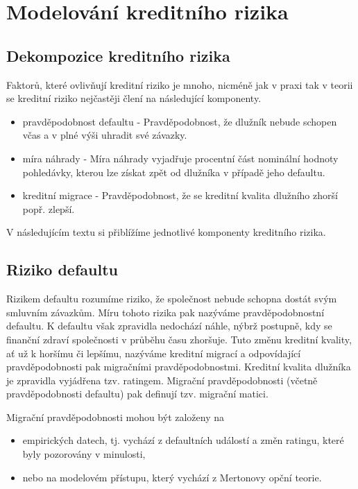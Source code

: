 \chapter{Modelování kreditního rizika}

\section{Dekompozice kreditního rizika}

Faktorů, které ovlivňují kreditní riziko je mnoho, nicméně jak v praxi tak v teorii se kreditní riziko nejčastěji člení na následující komponenty.
\begin{itemize}
\item pravděpodobnost defaultu - Pravděpodobnost, že dlužník nebude schopen včas a v plné výši uhradit své závazky.
\item míra náhrady - Míra náhrady vyjadřuje procentní část nominální hodnoty pohledávky, kterou lze získat zpět od dlužníka v případě jeho defaultu.
\item kreditní migrace - Pravděpodobnost, že se kreditní kvalita dlužního zhorší popř. zlepší.
\end{itemize}

V následujícím textu si přiblížíme jednotlivé komponenty kreditního rizika.

\section{Riziko defaultu}

Rizikem defaultu rozumíme riziko, že společnost nebude schopna dostát svým smluvním závazkům. Míru tohoto rizika pak nazýváme pravděpodobnostní defaultu. K defaultu však zpravidla nedochází náhle, nýbrž postupně, kdy se finanční zdraví společnosti v průběhu času zhoršuje. Tuto změnu kreditní kvality, ať už k horšímu či lepšímu, nazýváme kreditní migrací a odpovídající pravděpodobnosti pak migračními pravděpodobnostmi. Kreditní kvalita dlužníka je zpravidla vyjádřena tzv. ratingem. Migrační pravděpodobnosti (včetně pravděpodobnosti defaultu) pak definují tzv. migrační matici.

Migrační pravděpodobnosti mohou být založeny na
\begin{itemize}
\item empirických datech, tj. vychází z defaultních událostí a změn ratingu, které byly pozorovány v minulosti,
\item nebo na modelovém přístupu, který vychází z Mertonovy opční teorie.
\end{itemize}

